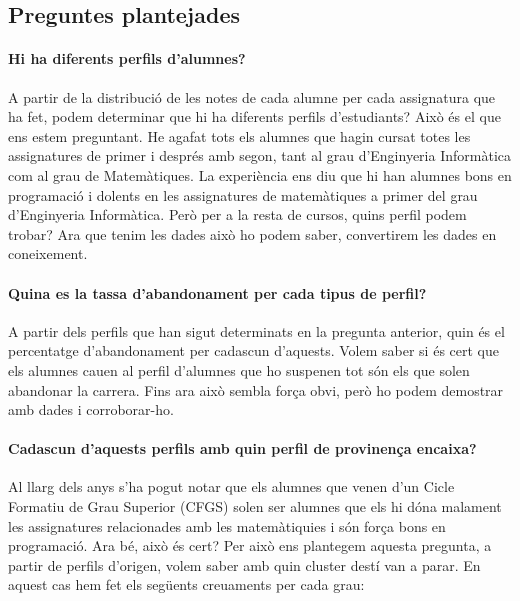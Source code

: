\documentclass[11pt,a4paper,catalan]{article}
\begin{document}
\subsection{Preguntes plantejades} 
\paragraph{Hi ha diferents perfils d'alumnes?}
A partir de la distribució de les notes de cada alumne per cada assignatura que ha fet, podem determinar que hi ha diferents perfils d'estudiants? Això és el que ens estem preguntant. He agafat tots els alumnes que hagin cursat totes les assignatures de primer i després amb segon, tant al grau d'Enginyeria Informàtica com al grau de Matemàtiques. La experiència ens diu que hi han alumnes bons en programació i dolents en les assignatures de matemàtiques a primer del grau d'Enginyeria Informàtica. Però per a la resta de cursos, quins perfil podem trobar? Ara que tenim les dades això ho podem saber, convertirem les dades en coneixement.

\paragraph{Quina es la tassa d'abandonament per cada tipus de perfil?}
A partir dels perfils que han sigut determinats en la pregunta anterior, quin és el percentatge d'abandonament per cadascun d'aquests. Volem saber si és cert que els alumnes cauen al perfil d'alumnes que ho suspenen tot són els que solen abandonar la carrera. Fins ara això sembla força obvi, però ho podem demostrar amb dades i corroborar-ho.

\paragraph{Cadascun d'aquests perfils amb quin perfil de provinença encaixa?}
Al llarg dels anys s'ha pogut notar que els alumnes que venen d'un Cicle Formatiu de Grau Superior (CFGS) solen ser alumnes que els hi dóna malament les assignatures relacionades amb les matemàtiquies i són força bons en programació. Ara bé, això és cert? Per això ens plantegem aquesta pregunta, a partir de perfils d'origen, volem saber amb quin cluster destí van a parar. En aquest cas hem fet els següents creuaments per cada grau:
\end{document}
